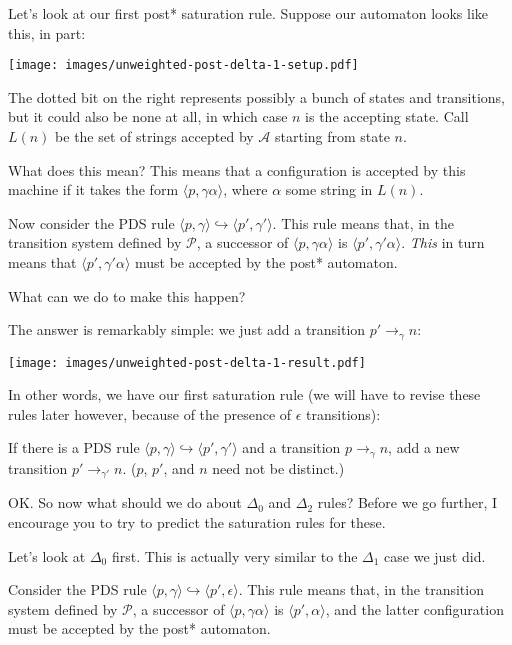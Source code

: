 \documentclass{article}
\newcommand{\Config}[2]{\ensuremath{\langle #1, #2 \rangle}}
\newcommand{\Rule}[2]{\ensuremath{#1 \hookrightarrow #2}}
\newcommand{\Trans}[3]{\ensuremath{#1 \rightarrow_{#2} #3}}
\begin{document}
Let's look at our first post* saturation rule. Suppose our automaton
looks like this, in part: \\
\begin{center}
  \texttt{[image: images/unweighted-post-delta-1-setup.pdf]}
\end{center}



The dotted bit on the right represents possibly a bunch of states and
transitions, but it could also be none at all, in which case $n$ is
the accepting state. Call $L(n)$ be the set of strings accepted by
$\mathcal{A}$ starting from state $n$.

What does this mean? This means that a configuration is accepted by
this machine if it takes the form \Config{p}{\gamma\alpha}, where
$\alpha$ some string in $L(n)$.

Now consider the PDS rule
\Rule{\Config{p}{\gamma}}{\Config{p'}{\gamma'}}. This rule means that,
in the transition system defined by $\mathcal{P}$, a successor of
\Config{p}{\gamma\alpha} is \Config{p'}{\gamma'\alpha}. \emph{This} in
turn means
that \Config{p'}{\gamma'\alpha} must be accepted by the post*
automaton.

What can we do to make this happen?

The answer is remarkably simple: we just add a transition
$\Trans{p'}{\gamma}{n}$:\\
\begin{center}
  \texttt{[image: images/unweighted-post-delta-1-result.pdf]}
\end{center}

In other words, we have our first saturation rule (we will have to
revise these rules later however, because of the presence of
$\epsilon$ transitions):

   If there is a PDS rule
   \Rule{\Config{p}{\gamma}}{\Config{p'}{\gamma'}} and a transition
   \Trans{p}{\gamma}{n}, add a new transition
   \Trans{p'}{\gamma'}{n}. ($p$, $p'$, and $n$ need not be distinct.)

OK. So now what should we do about $\Delta_0$ and $\Delta_2$ rules?
Before we go further, I encourage you to try to predict the saturation
rules for these.

Let's look at $\Delta_0$ first. This is actually very similar to the
$\Delta_1$ case we just did.

Consider the PDS rule
\Rule{\Config{p}{\gamma}}{\Config{p'}{\epsilon}}. This rule means that,
in the transition system defined by $\mathcal{P}$, a successor of
\Config{p}{\gamma\alpha} is \Config{p'}{\alpha}, and the latter
configuration must be accepted by the post* automaton.
\end{document}
